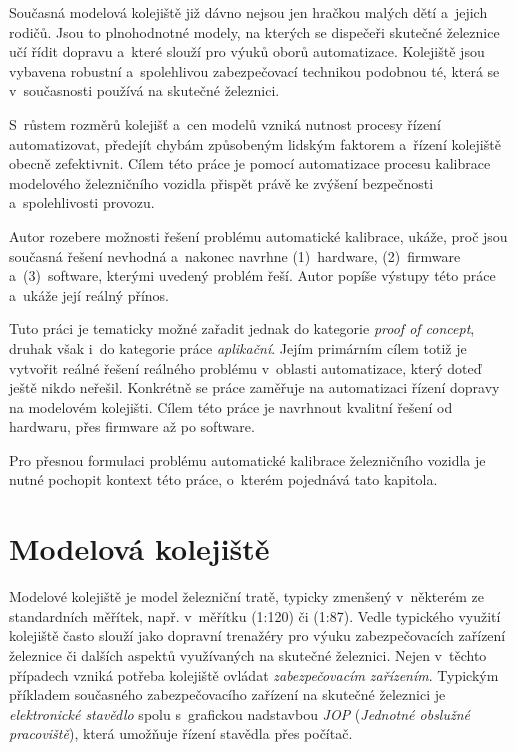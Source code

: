 Současná modelová kolejiště již dávno nejsou jen hračkou malých dětí
a~jejich rodičů. Jsou to plnohodnotné modely, na kterých se dispečeři skutečné
železnice učí řídit dopravu a~které slouží pro výuků oborů automatizace.
Kolejiště jsou vybavena robustní a~spolehlivou zabezpečovací technikou
podobnou té, která se v~současnosti používá na skutečné železnici.

S~růstem rozměrů kolejišť a~cen modelů vzniká nutnost procesy řízení
automatizovat, předejít chybám způsobeným lidským faktorem a~řízení kolejiště
obecně zefektivnit. Cílem této práce je pomocí automatizace procesu kalibrace
modelového železničního vozidla přispět právě ke zvýšení bezpečnosti
a~spolehlivosti provozu.

Autor rozebere možnosti řešení problému automatické kalibrace, uká\-že, proč
jsou současná řešení nevhodná a~nakonec navrhne (1)~hardware, (2)~firmware
a~(3)~software, kterými uvedený problém řeší. Autor popíše výstupy této práce
a~ukáže její reálný přínos.

Tuto práci je tematicky možné zařadit jednak do kategorie \textit{proof of
concept}, druhak však i~do kategorie práce \textit{aplikační}. Jejím primárním
cílem totiž je vytvořit reálné řešení reálného problému v~oblasti automatizace,
který doteď ještě nikdo neřešil. Konkrétně se práce zaměřuje na automatizaci
řízení dopravy na modelovém kolejišti. Cílem této práce je navrhnout kvalitní
řešení od hardwaru, přes firmware až po software.

Pro přesnou formulaci problému automatické kalibrace železničního vozidla je
nutné pochopit kontext této práce, o~kterém pojednává tato kapitola.

\section{Modelová kolejiště}
\label{sec:mod-kol}

Modelové kolejiště je model železniční tratě, typicky zmenšený v~některém ze
standardních měřítek, např. v~měřítku  (1:120) či  (1:87). Vedle
typického  využití kolejiště často slouží jako dopravní trenažéry pro
výuku zabezpečovacích zařízení železnice či dalších aspektů využívaných na
skutečné železnici. Nejen v~těchto případech vzniká potřeba kolejiště ovládat
\textit{zabezpečovacím zařízením}. Typickým příkladem současného
zabezpečovacího zařízení na skutečné železnici je \textit{elektronické
stavědlo} spolu s~grafickou nadstavbou \textit{\gls{JOP}} (\textit{Jednotné
obslužné pracoviště}), která umožňuje řízení stavědla přes počítač.

